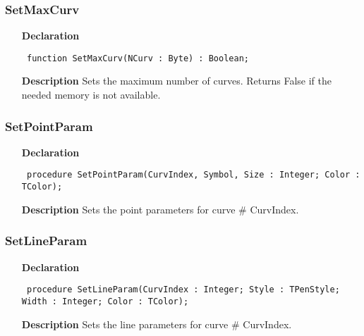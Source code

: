 \documentclass[12pt,a4paper,oneside]{report}
\newcommand{\declarationitem}[1]{\textbf{#1}}
\newcommand{\descriptiontitle}[1]{\textbf{#1}}
\newcommand{\code}[1]{\texttt{#1}}
\begin{document}
\subsubsection{SetMaxCurv}
\label{uwinplot-SetMaxCurv}
\begin{itemize}\item[\declarationitem{Declaration}\hfill]
	\begin{flushleft}
		\code{
			function SetMaxCurv(NCurv : Byte) : Boolean;}
		
	\end{flushleft}
	
	\par
	\item[\descriptiontitle{Description}]
	Sets the maximum number of curves. Returns False if the needed memory is not available.
	
\end{itemize}
\subsubsection{SetPointParam}
\label{uwinplot-SetPointParam}
\begin{itemize}\item[\declarationitem{Declaration}\hfill]
	\begin{flushleft}
		\code{
			procedure SetPointParam(CurvIndex, Symbol, Size : Integer; Color : TColor);}
		
	\end{flushleft}
	
	\par
	\item[\descriptiontitle{Description}]
	Sets the point parameters for curve {\#} CurvIndex.
	
\end{itemize}
\subsubsection{SetLineParam}
\label{uwinplot-SetLineParam}
\begin{itemize}\item[\declarationitem{Declaration}\hfill]
	\begin{flushleft}
		\code{
			procedure SetLineParam(CurvIndex : Integer; Style : TPenStyle; Width : Integer; Color : TColor);}
		
	\end{flushleft}
	
	\par
	\item[\descriptiontitle{Description}]
	Sets the line parameters for curve {\#} CurvIndex.
	
\end{itemize}
\end{document}
